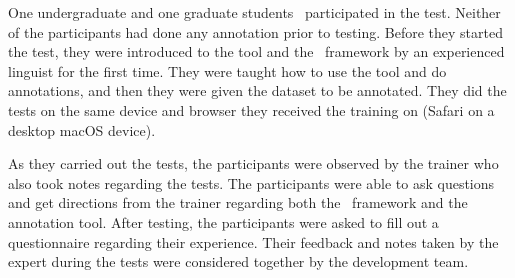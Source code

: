 One undergraduate and one graduate students~\cite{anon} participated in the test.
Neither of the participants had done any annotation prior to testing.
Before they started the test, they were introduced to the tool and the \ud\ framework by an experienced linguist for the first time.
They were taught how to use the tool and do annotations, and then they were given the dataset to be annotated.
They did the tests on the same device and browser they received the training on (Safari on a desktop macOS device). 

As they carried out the tests, the participants were observed by the trainer who also took notes regarding the tests.
The participants were able to ask questions and get directions from the trainer regarding both the \ud\ framework and the annotation tool.
After testing, the participants were asked to fill out a questionnaire regarding their experience.
Their feedback and notes taken by the expert during the tests were considered together by the development team.